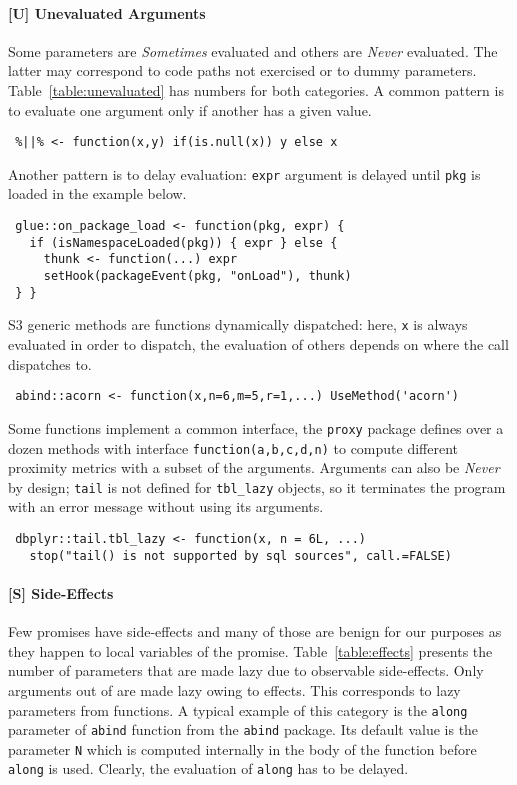 \documentclass[review,screen,acmsmall]{acmart}
\newcommand{\sometimes}{\emph{Sometimes}\xspace}
\newcommand{\never}{\emph{Never}\xspace}
\newcommand{\code}[1]{\lstinline |#1|\xspace}
\renewcommand{\c}[1]{\lstinline |#1|\xspace}
\begin{document}
\paragraph{{\normalfont \textbf{[U]}} Unevaluated Arguments}
Some parameters are \sometimes evaluated and others are \never evaluated. The
latter may correspond to code paths not exercised or to dummy parameters.
Table~\ref{table:unevaluated} has numbers for both categories. A common pattern
is to evaluate one argument only if another has a given value.

\begin{lstlisting}
 %||% <- function(x,y) if(is.null(x)) y else x
\end{lstlisting}

Another pattern is to delay evaluation: \c{expr} argument is delayed until
\c{pkg} is loaded in the example below.

\begin{lstlisting}
 glue::on_package_load <- function(pkg, expr) {
   if (isNamespaceLoaded(pkg)) { expr } else {
     thunk <- function(...) expr
     setHook(packageEvent(pkg, "onLoad"), thunk)
 } }
\end{lstlisting}

S3 generic methods are functions dynamically dispatched: here, \c x is always
evaluated in order to dispatch, the evaluation of others depends on where the
call dispatches to.

\begin{lstlisting}
 abind::acorn <- function(x,n=6,m=5,r=1,...) UseMethod('acorn')
\end{lstlisting}

Some functions implement a common interface, the \c{proxy} package defines over
a dozen methods with interface \c{function(a,b,c,d,n)} to compute different
proximity metrics with a subset of the arguments. Arguments can also be \never
by design; \c{tail} is not defined for \c{tbl_lazy} objects, so it terminates
the program with an error message without using its arguments.

\begin{lstlisting}
 dbplyr::tail.tbl_lazy <- function(x, n = 6L, ...)
   stop("tail() is not supported by sql sources", call.=FALSE)
\end{lstlisting}


\paragraph{{\normalfont \textbf{[S]}} Side-Effects}
Few promises have side-effects and many of those are benign for our purposes as
they happen to local variables of the promise. Table~\ref{table:effects}
presents the number of parameters that are made lazy due to observable
side-effects. Only \EffectCountArgumentsTotal arguments out of
\TotalArgumentCount are made lazy owing to effects. This corresponds to
\EffectCountParametersTotal lazy parameters from \EffectCountFunctionsTotal
functions. A typical example of this category is the \code{along} parameter of
\code{abind} function from the \code{abind} package. Its default value is the
parameter \code{N} which is computed internally in the body of the function
before \code{along} is used. Clearly, the evaluation of \code{along} has to be
delayed.
\end{document}

